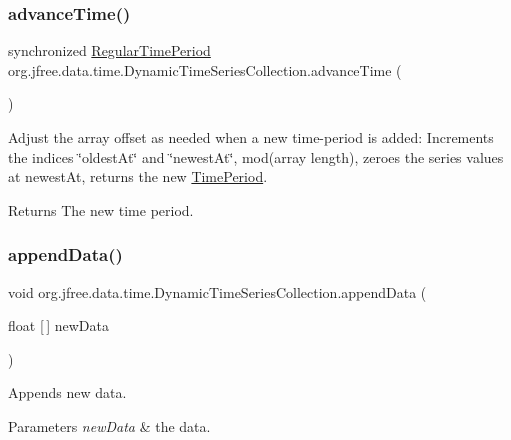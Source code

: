 \subsubsection{\texorpdfstring{advance\+Time()}{advanceTime()}}
{\footnotesize\ttfamily synchronized \mbox{\hyperlink{classorg_1_1jfree_1_1data_1_1time_1_1_regular_time_period}{Regular\+Time\+Period}} org.\+jfree.\+data.\+time.\+Dynamic\+Time\+Series\+Collection.\+advance\+Time (\begin{DoxyParamCaption}{ }\end{DoxyParamCaption})}

Adjust the array offset as needed when a new time-\/period is added\+: Increments the indices \char`\"{}oldest\+At\char`\"{} and \char`\"{}newest\+At\char`\"{}, mod(array length), zeroes the series values at newest\+At, returns the new \mbox{\hyperlink{interfaceorg_1_1jfree_1_1data_1_1time_1_1_time_period}{Time\+Period}}.

\begin{DoxyReturn}{Returns}
The new time period. 
\end{DoxyReturn}
\mbox{\label{classorg_1_1jfree_1_1data_1_1time_1_1_dynamic_time_series_collection_aa6259174ec34b944b2cd14a36562c01a}} 
\subsubsection{\texorpdfstring{append\+Data()}{appendData()}\hspace{0.1cm}{\footnotesize\ttfamily [1/2]}}
{\footnotesize\ttfamily void org.\+jfree.\+data.\+time.\+Dynamic\+Time\+Series\+Collection.\+append\+Data (\begin{DoxyParamCaption}\item[{float \mbox{[}$\,$\mbox{]}}]{new\+Data }\end{DoxyParamCaption})}

Appends new data.


\begin{DoxyParams}{Parameters}
{\em new\+Data} & the data. \\
\hline
\end{DoxyParams}
\mbox{\label{classorg_1_1jfree_1_1data_1_1time_1_1_dynamic_time_series_collection_a22d2ef9d2a5591bbb6e5569f11db5160}} 
